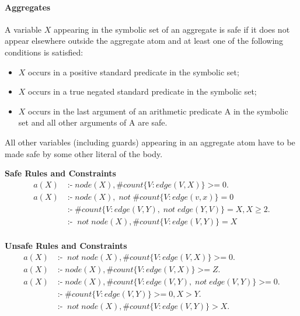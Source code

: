 \documentclass[a4paper, titlepage]{article}
\DeclareMathOperator{\leftimpl}{:-}
\DeclareMathOperator{\nott}{\mathit{not}}
\DeclareMathOperator{\geeq}{>=}
\begin{document}
\paragraph{Aggregates}
A variable $X$ appearing in the symbolic set of an aggregate is safe if it does not appear elsewhere outside the aggregate atom and at least one of the following conditions is satisfied:
\begin{itemize}
\item $X$ occurs in a positive standard predicate in the symbolic set;
\item $X$ occurs in a true negated standard predicate in the symbolic set;
\item $X$ occurs in the last argument of an arithmetic predicate A in the symbolic set and all other arguments of A are safe.
\end{itemize}
All other variables (including guards) appearing in an aggregate atom have to be made safe by some other literal of the body.
\begin{exmp} \textbf{Safe Rules and Constraints}
\begin{align*}
a(X) & \leftimpl node(X), \#count\{ V \colon edge(V,X)\} \geeq 0. \\
a(X) & \leftimpl node(X), \nott \#count\{ V \colon edge(v,x)\} = 0\\
& \leftimpl \#count\{V \colon edge(V,Y), \nott edge(Y,V)\}=X, X\geq2.\\
& \leftimpl \nott node(X), \#count\{ V \colon edge(V,Y)\}=X\\
\end{align*}
\end{exmp}

\begin{exmp} \textbf{Unsafe Rules and Constraints}
\begin{align*}
a(X) & \leftimpl \nott node(X), \#count\{V \colon edge(V,X)\} \geeq 0. \\
a(X) & \leftimpl node(X), \#count\{V \colon edge(V,X)\} \geeq Z. \\
a(X) & \leftimpl node(X), \#count\{V \colon edge(V,Y), \nott edge(V,Y)\} \geeq 0. \\
& \leftimpl \#count\{ V \colon edge(V,Y)\} \geeq 0, X > Y. \\
& \leftimpl \nott node(X), \#count\{V \colon edge(V,Y)\} > X. 
\end{align*}
\end{exmp}
\end{document}

